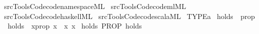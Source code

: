 \begin{isabellebody}
\isamarkupfalse%
\ {\isacartoucheopen}{\isachartilde}{\kern0pt}{\isachartilde}{\kern0pt}{\isacharslash}{\kern0pt}src{\isacharslash}{\kern0pt}Tools{\isacharslash}{\kern0pt}Code{\isacharslash}{\kern0pt}code{\isacharunderscore}{\kern0pt}namespace{\isachardot}{\kern0pt}ML{\isacartoucheclose}\isanewline
{}\isamarkupfalse%
\ {\isacartoucheopen}{\isachartilde}{\kern0pt}{\isachartilde}{\kern0pt}{\isacharslash}{\kern0pt}src{\isacharslash}{\kern0pt}Tools{\isacharslash}{\kern0pt}Code{\isacharslash}{\kern0pt}code{\isacharunderscore}{\kern0pt}ml{\isachardot}{\kern0pt}ML{\isacartoucheclose}\isanewline
{}\isamarkupfalse%
\ {\isacartoucheopen}{\isachartilde}{\kern0pt}{\isachartilde}{\kern0pt}{\isacharslash}{\kern0pt}src{\isacharslash}{\kern0pt}Tools{\isacharslash}{\kern0pt}Code{\isacharslash}{\kern0pt}code{\isacharunderscore}{\kern0pt}haskell{\isachardot}{\kern0pt}ML{\isacartoucheclose}\isanewline
{}\isamarkupfalse%
\ {\isacartoucheopen}{\isachartilde}{\kern0pt}{\isachartilde}{\kern0pt}{\isacharslash}{\kern0pt}src{\isacharslash}{\kern0pt}Tools{\isacharslash}{\kern0pt}Code{\isacharslash}{\kern0pt}code{\isacharunderscore}{\kern0pt}scala{\isachardot}{\kern0pt}ML{\isacartoucheclose}%
\endisatagML
{\isafoldML}%
%
\isadelimML
\isanewline
%
\endisadelimML
\isanewline
{}\isamarkupfalse%
\ {\isachardoublequoteopen}TYPE{\isacharparenleft}{\kern0pt}{\isacharprime}{\kern0pt}a{\isacharcolon}{\kern0pt}{\isacharcolon}{\kern0pt}{\isacharbraceleft}{\kern0pt}{\isacharbraceright}{\kern0pt}{\isacharparenright}{\kern0pt}{\isachardoublequoteclose}\isanewline
\isanewline
{}\isamarkupfalse%
\ holds\ {\isacharcolon}{\kern0pt}{\isacharcolon}{\kern0pt}\ {\isachardoublequoteopen}prop{\isachardoublequoteclose}\ \isanewline
\ \ {\isachardoublequoteopen}holds\ {\isasymequiv}\ {\isacharparenleft}{\kern0pt}{\isacharparenleft}{\kern0pt}{\isasymlambda}x{\isacharcolon}{\kern0pt}{\isacharcolon}{\kern0pt}prop{\isachardot}{\kern0pt}\ x{\isacharparenright}{\kern0pt}\ {\isasymequiv}\ {\isacharparenleft}{\kern0pt}{\isasymlambda}x{\isachardot}{\kern0pt}\ x{\isacharparenright}{\kern0pt}{\isacharparenright}{\kern0pt}{\isachardoublequoteclose}\isanewline
\isanewline
{}\isamarkupfalse%
\ holds{\isacharcolon}{\kern0pt}\ {\isachardoublequoteopen}PROP\ holds{\isachardoublequoteclose}\isanewline
%
\isadelimproof
\ \ %
\endisadelimproof

\end{isabellebody}
